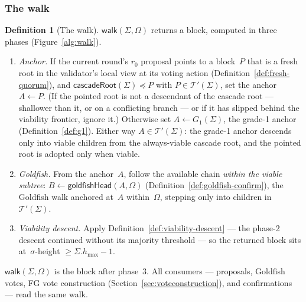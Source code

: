 \ifx\litemode\undefined\documentclass{article}\fi
\newcommand{\hmax}{\ensuremath{h_{\max}}\xspace}
\newcommand{\viableTree}{\ensuremath{\mathcal{T}'}}
\newcommand{\Gone}{\ensuremath{G_{1}}}
\newcommand{\rzero}{\ensuremath{r_{0}}}                 %
\newcommand{\cascadeRoot}{\textsf{cascadeRoot}\xspace}
\newcommand{\walk}{\textsf{walk}\xspace}
\theoremstyle{plain}
\theoremstyle{definition}
\newtheorem{definition}{Definition}
\theoremstyle{remark}
\begin{document}
\subsubsection*{The walk}

\begin{definition}[The walk]\label{def:walk}
$\walk(\Sigma, \Omega)$ returns a block, computed in three phases
(Figure~\ref{alg:walk}).
\begin{enumerate}
  \item \emph{Anchor.}  If the current round's $\rzero$ proposal points to a
    block~$P$ that is a fresh root in the validator's local view at its voting
    action (Definition~\ref{def:fresh-quorum}), and
    $\cascadeRoot(\Sigma) \preceq P$ with
    $P \in \viableTree(\Sigma)$, set the anchor $A \gets P$.
    (If the pointed root is not a descendant of the cascade root --- shallower
    than it, or on a conflicting branch --- or if it has slipped behind the
    viability frontier, ignore it.)  Otherwise set
    $A \gets \Gone(\Sigma)$, the grade-1 anchor (Definition~\ref{def:g1}).  Either
    way $A \in \viableTree(\Sigma)$: the grade-1 anchor descends only into viable
    children from the always-viable cascade root, and the pointed root is
    adopted only when viable.
  \item \emph{Goldfish.}  From the anchor~$A$, follow the available chain
    \emph{within the viable subtree}: $B \gets \textsf{goldfishHead}(A, \Omega)$
    (Definition~\ref{def:goldfish-confirm}), the Goldfish walk anchored at~$A$
    within~$\Omega$, stepping only into children in~$\viableTree(\Sigma)$.
  \item \emph{Viability descent.}  Apply Definition~\ref{def:viability-descent}
    --- the phase-2 descent continued without its majority threshold ---
    so the returned block sits at~$\sigma$-height $\geq \Sigma.\hmax - 1$.
\end{enumerate}
$\walk(\Sigma, \Omega)$ is the block after phase~3.  All consumers ---
proposals, Goldfish votes, FG vote construction
(Section~\ref{sec:voteconstruction}), and confirmations --- read the same
\walk.
\end{definition}
\end{document}

